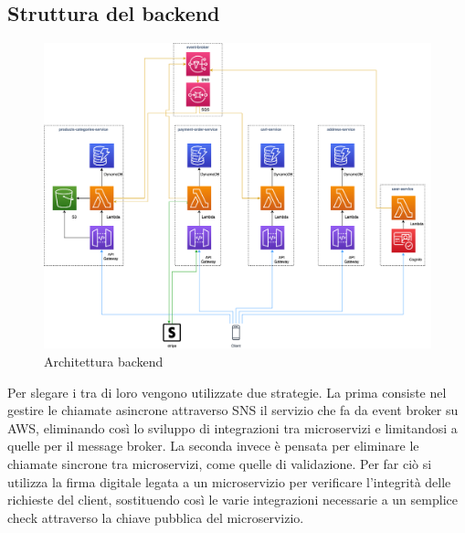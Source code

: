 \subsection{Struttura del backend}
\begin{figure}[H]
	\centering
	\includegraphics[scale=0.4]{Immagini/Backend/AWSArchitecture.png}
	\caption{Architettura backend}
	\label{fig:backend}
\end{figure}
Per slegare i  tra di loro vengono utilizzate due strategie. La prima consiste nel gestire le chiamate asincrone attraverso SNS il servizio che fa da event broker su AWS, eliminando così lo sviluppo di integrazioni tra microservizi e limitandosi a quelle per il message broker.
La seconda invece è pensata per eliminare le chiamate sincrone tra microservizi, come quelle di validazione. Per far ciò si utilizza la firma digitale legata a un microservizio per verificare l'integrità delle richieste del client, sostituendo così le varie integrazioni necessarie a un semplice check attraverso la chiave pubblica del microservizio.


